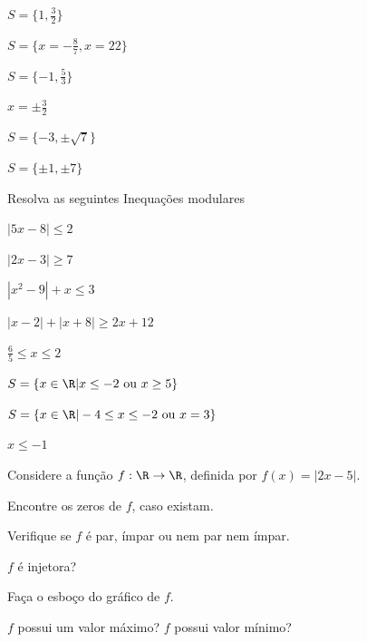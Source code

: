 \begin{exercises*}
\begin{exercise}
  \begin{answer}
    \begin{alphalist}
      \item $S=\{ 1, \frac{3}{2}\}$
      \item $S=\{x=-\frac{8}{7}, x=22\}$
      \item $S=\{-1,\frac{5}{3}\}$
      \item $x=\pm \frac{3}{2}$
      \item $S=\{-3, \pm\sqrt{7}\}$
      \item $S=\{\pm 1, \pm 7\}$
    \end{alphalist}
  \end{answer}
\end{exercise}

\begin{exercise}
  Resolva as seguintes Inequações modulares
  \begin{alphalist}
    \item $| 5x-8| \leq 2$
    \item $|2x-3| \geq 7$
    \item $|x^2-9|+x \leq 3$
    \item $|x-2|+ |x+8| \geq 2x+12$
  \end{alphalist}

  \begin{answer}
    \begin{alphalist}
      \item $\frac{6}{5} \leq x \leq 2$
      \item $S= \{ x \in \R| x \leq -2
            \text{ ou } x \geq 5\}$
      \item $S= \{ x \in \R| -4 \leq x \leq -2
            \text{ ou } x=3\}$
      \item $x \leq -1$
    \end{alphalist}
  \end{answer}
\end{exercise}

\begin{exercise}
  Considere a função $f: \R \to \R$, definida por $f(x)= | 2x-5|$.
  \begin{alphalist}
    \item Encontre os zeros de $f$, caso existam.
    \item Verifique se $f$ é par, ímpar ou nem par nem ímpar.
    \item $f$ é injetora?
    \item Faça o esboço do gráfico de $f$.
    \item $f$ possui um valor máximo? $f$ possui valor mínimo?
  \end{alphalist}


\end{exercise}
\end{exercises*}
